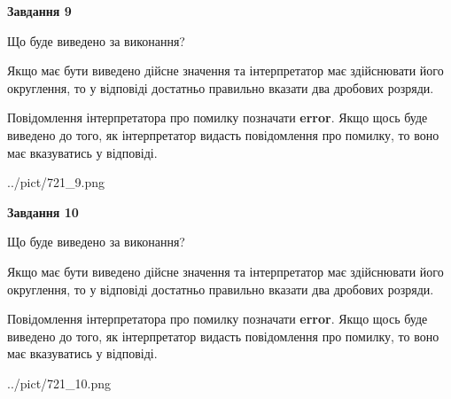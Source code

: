 \documentclass[12pt, ukrainian]{article}
\begin{document}
{\begin {Large}
{\begin {center}\textbf{Завдання 9}\end {center}}\par
Що буде виведено за виконання? \par

Якщо має бути виведено дійсне значення та інтерпретатор має здійснювати його округлення, 
то у відповіді достатньо правильно вказати два дробових розряди.

Повідомлення інтерпретатора про помилку позначати \textbf{error}.
Якщо щось буде виведено до того, як інтерпретатор видасть повідомлення про помилку, 
то воно має вказуватись у відповіді. \par

\begin{center}
	{../pict/721_9.png}
\end{center}
\newpage

{\begin {center}\textbf{Завдання 10}\end {center}}\par
Що буде виведено за виконання? \par

Якщо має бути виведено дійсне значення та інтерпретатор має здійснювати його округлення, 
то у відповіді достатньо правильно вказати два дробових розряди.

Повідомлення інтерпретатора про помилку позначати \textbf{error}.
Якщо щось буде виведено до того, як інтерпретатор видасть повідомлення про помилку, 
то воно має вказуватись у відповіді. \par

\begin{center}
	{../pict/721_10.png}
\end{center}
\newpage

\end {Large}}
\end{document}
